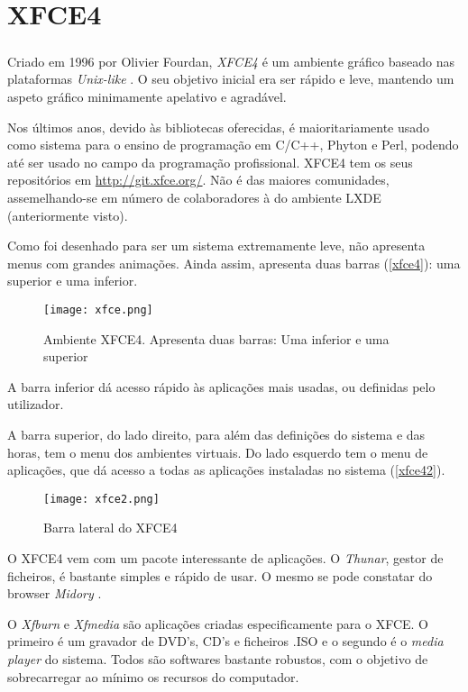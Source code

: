 \documentclass[11pt,openright,twoside]{report}
\begin{document}
\chapter{XFCE4}

\paragraph{  }Criado em 1996 por Olivier Fourdan, \textit{XFCE4} é um ambiente gráfico baseado nas plataformas \textit{Unix-like} \cite{XFCE4}. O seu objetivo inicial era ser rápido e leve, mantendo um aspeto gráfico minimamente apelativo e agradável.

Nos últimos anos, devido às bibliotecas oferecidas, é maioritariamente usado como sistema para o ensino de programação em C/C++, Phyton e Perl, podendo até ser usado no campo da programação profissional. XFCE4 tem os seus repositórios em \url{http://git.xfce.org/}. Não é das maiores comunidades, assemelhando-se em número de colaboradores à do ambiente LXDE (anteriormente visto).

Como foi desenhado para ser um sistema extremamente leve, não apresenta menus com grandes animações. Ainda assim, apresenta duas barras (\autoref{xfce4}): uma superior e uma inferior.

\begin{figure}
 \center
 \texttt{[image: xfce.png]}
 \caption{Ambiente XFCE4. Apresenta duas barras: Uma inferior e uma superior}
 \label{xfce4}
\end{figure}

A barra inferior dá acesso rápido às aplicações mais usadas, ou definidas pelo utilizador.

A barra superior, do lado direito, para além das definições do sistema e das horas, tem o menu dos ambientes virtuais. Do lado esquerdo tem o menu de aplicações, que dá acesso a todas as aplicações instaladas no sistema (\autoref{xfce42}).

\begin{figure}
 \center
 \texttt{[image: xfce2.png]}
 \caption{Barra lateral do XFCE4}
 \label{xfce42}
\end{figure}

O XFCE4 vem com um pacote interessante de aplicações. O \textit{Thunar}, gestor de ficheiros, é bastante simples e rápido de usar. O mesmo se pode constatar do browser \textit{Midory} \cite{AplicacoesXFCE4}.

O \textit{Xfburn} e \textit{Xfmedia} são aplicações criadas especificamente para o XFCE. O primeiro é um gravador de DVD's, CD's e ficheiros .ISO e o segundo é o \textit{media player} do sistema. Todos são softwares bastante robustos, com o objetivo de sobrecarregar ao mínimo os recursos do computador.
\end{document}
